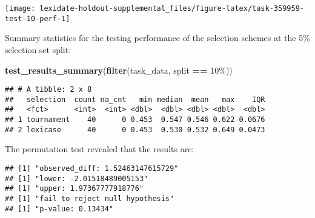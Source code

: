 \documentclass[
]{book}
\newenvironment{Shaded}{\begin{snugshade}}{\end{snugshade}}
\newcommand{\AttributeTok}[1]{\textcolor[rgb]{0.13,0.29,0.53}{#1}}
\newcommand{\DecValTok}[1]{\textcolor[rgb]{0.00,0.00,0.81}{#1}}
\newcommand{\FunctionTok}[1]{\textcolor[rgb]{0.13,0.29,0.53}{\textbf{#1}}}
\newcommand{\NormalTok}[1]{#1}
\newcommand{\OtherTok}[1]{\textcolor[rgb]{0.56,0.35,0.01}{#1}}
\newcommand{\SpecialCharTok}[1]{\textcolor[rgb]{0.81,0.36,0.00}{\textbf{#1}}}
\newcommand{\StringTok}[1]{\textcolor[rgb]{0.31,0.60,0.02}{#1}}
\begin{document}
\texttt{[image: lexidate-holdout-supplemental\_files/figure-latex/task-359959-test-10-perf-1]}

Summary statistics for the testing performance of the selection schemes at the 5\% selection set split:

\begin{Shaded}
\begin{Highlighting}[]
\FunctionTok{test\_results\_summary}\NormalTok{(}\FunctionTok{filter}\NormalTok{(task\_data, split }\SpecialCharTok{==} \StringTok{\textquotesingle{}10\%\textquotesingle{}}\NormalTok{))}
\end{Highlighting}
\end{Shaded}

\begin{verbatim}
## # A tibble: 2 x 8
##   selection  count na_cnt   min median  mean   max    IQR
##   <fct>      <int>  <int> <dbl>  <dbl> <dbl> <dbl>  <dbl>
## 1 tournament    40      0 0.453  0.547 0.546 0.622 0.0676
## 2 lexicase      40      0 0.453  0.530 0.532 0.649 0.0473
\end{verbatim}

The permutation test revealed that the results are:

\begin{Shaded}
\end{Shaded}

\begin{verbatim}
## [1] "observed_diff: 1.52463147615729"
## [1] "lower: -2.01518489005153"
## [1] "upper: 1.97367777918776"
## [1] "fail to reject null hypothesis"
## [1] "p-value: 0.13434"
\end{verbatim}
\end{document}
